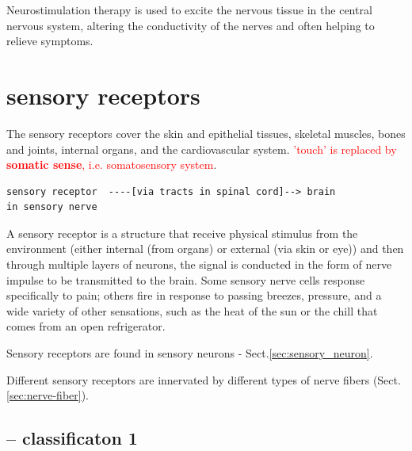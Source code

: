 \begin{mdframed}
Neurostimulation therapy is used to excite the nervous tissue in the central
nervous system, altering the conductivity of the nerves and often helping to
relieve symptoms.

\end{mdframed}



\section{sensory receptors}
\label{sec:sensory-receptors}

The sensory receptors cover the skin and epithelial tissues, skeletal muscles,
bones and joints, internal organs, and the cardiovascular system.
\textcolor{red}{'touch' is replaced by {\bf somatic sense}, i.e. somatosensory
system}.

{\small
\begin{verbatim}
sensory receptor  ----[via tracts in spinal cord]--> brain
in sensory nerve 
\end{verbatim}
}

A sensory receptor is a structure that receive physical stimulus from the
environment (either internal (from organs) or external (via skin or eye)) and
then through multiple layers of neurons, the signal is conducted in the form of
nerve impulse to be transmitted to the brain.
Some sensory nerve cells response specifically to pain; others fire in response
to passing breezes, pressure, and a wide variety of other sensations, such as the
heat of the sun or the chill that comes from an open refrigerator.


Sensory receptors are found in sensory neurons - Sect.\ref{sec:sensory_neuron}.


Different sensory receptors are innervated by different types of nerve fibers
(Sect.\ref{sec:nerve-fiber}).


\subsection{-- classificaton 1}

